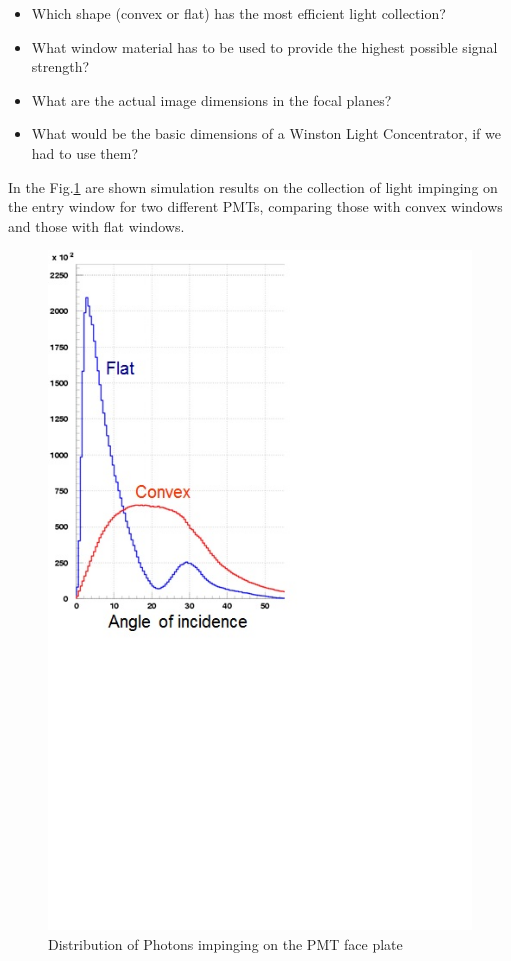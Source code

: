 \begin{itemize}
\item Which shape (convex or flat) has the most efficient light collection?
\item What window material has to be used to provide the highest possible signal strength?
\item What are the actual image dimensions in the focal planes?
\item What would be the basic dimensions of a Winston Light Concentrator, if we had to use them?
\end{itemize}

In the Fig.\ref{fig:Flat_Convex} are shown simulation results on the collection of light impinging on the entry window for two different PMTs, comparing those with convex windows and those with flat windows. 

\begin{figure}[!h]
    \centering
    \includegraphics[width=1.0\linewidth,trim={0.0cm 9.1cm 6.3cm 0.1cm},clip]{images/Flat_Convex.jpg}
    \caption{Distribution of Photons impinging on the PMT face plate}
    \label{fig:Flat_Convex}
\end{figure}

